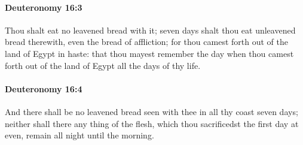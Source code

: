 		\paragraph{Deuteronomy 16:3} %
			\label{DEUTERONOMY-16-3}

			Thou shalt eat no leavened bread with it; seven days shalt thou eat unleavened bread therewith, even the bread of affliction; for thou camest forth out of the land of Egypt in haste: that thou mayest remember the day when thou camest forth out of the land of Egypt all the days of thy life.


		\paragraph{Deuteronomy 16:4} %
			\label{DEUTERONOMY-16-4}

			And there shall be no leavened bread seen with thee in all thy coast seven days; neither shall there any thing of the flesh, which thou sacrificedst the first day at even, remain all night until the morning.

